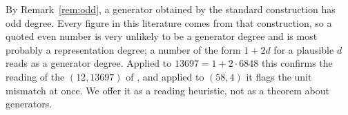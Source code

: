 By Remark~\ref{rem:odd}, a generator obtained by the standard construction has
odd degree. Every figure in this literature comes from that construction, so a
quoted even number is very unlikely to be a generator degree and is most
probably a representation degree; a number of the form $1+2d$ for a plausible
$d$ reads as a generator degree. Applied to $13697=1+2\cdot6848$ this confirms
the reading of the $(12,13697)$ of \cite{jsww1976}, and applied to $(58,4)$ it
flags the unit mismatch at once. We offer it as a reading heuristic, not as a
theorem about generators.
